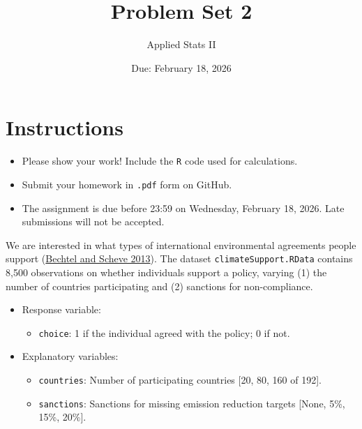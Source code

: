 \documentclass[12pt,letterpaper]{article}
\title{Problem Set 2}
\date{Due: February 18, 2026}
\author{Applied Stats II}
\begin{document}
	\maketitle
	
	\section*{Instructions}
	\begin{itemize}
		\item Please show your work! Include the \texttt{R} code used for calculations.
		\item Submit your homework in \texttt{.pdf} form on GitHub.
		\item The assignment is due before 23:59 on Wednesday, February 18, 2026. Late submissions will not be accepted.
	\end{itemize}
	
	\noindent We are interested in what types of international environmental agreements people support (\href{https://www.pnas.org/content/110/34/13763}{Bechtel and Scheve 2013}). The dataset \texttt{climateSupport.RData} contains 8,500 observations on whether individuals support a policy, varying (1) the number of countries participating and (2) sanctions for non-compliance.  
	
	\begin{itemize}
		\item Response variable: 
		\begin{itemize}
			\item \texttt{choice}: 1 if the individual agreed with the policy; 0 if not.
		\end{itemize}
		\item Explanatory variables:
		\begin{itemize}
			\item \texttt{countries}: Number of participating countries [20, 80, 160 of 192].
			\item \texttt{sanctions}: Sanctions for missing emission reduction targets [None, 5\%, 15\%, 20\%].
		\end{itemize}
	\end{itemize}
	
	\newpage
	
\end{document}
